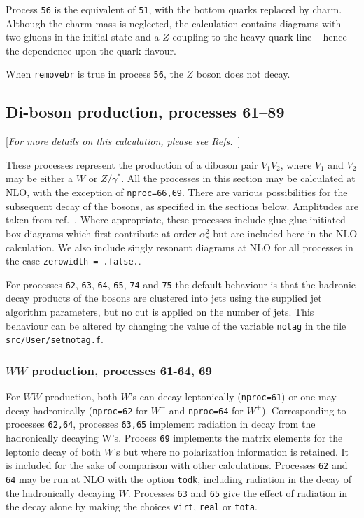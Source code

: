Process {\tt 56} is the equivalent of {\tt 51}, with the bottom quarks
replaced by charm. Although the charm mass is neglected, the calculation
contains diagrams with two gluons in the initial state and a
$Z$ coupling to the heavy quark line -- hence the dependence upon the quark
flavour.

When {\tt removebr} is true in process {\tt 56}, the $Z$ boson does not decay.

\subsection{Di-boson production, processes 61--89}
\label{subsec:diboson}

\begin{center}
[{\it For more details on this calculation, please see Refs.~\cite{Campbell:1999ah,Campbell:2011bn}}]
\end{center}

These processes represent the production of a diboson pair $V_1 V_2$,
where $V_1$ and $V_2$ may be either a $W$ or $Z/\gamma^*$. 
All the processes in this section may be calculated at NLO, with the exception
of {\tt nproc=66,69}. There are various
possibilities for the subsequent decay of the bosons, as specified in the
sections below. Amplitudes are taken from ref.~\cite{Dixon:1998py}.
Where appropriate, these processes include glue-glue initiated box diagrams
which first contribute at order $\alpha_s^2$ but are included here in the
NLO calculation. We also include singly resonant diagrams at NLO for all processes
in the case {\tt zerowidth = .false.}.

For processes {\tt 62}, {\tt 63}, {\tt 64}, {\tt 65}, {\tt 74}
and {\tt 75} the default behaviour is that the hadronic decay products
of the bosons are clustered into jets using the supplied jet
algorithm parameters, but no cut is applied on the number of jets.
This behaviour can be altered by changing the value of the
variable {\tt notag} in the file {\tt src/User/setnotag.f}.
 
\subsubsection{$WW$ production, processes 61-64, 69}

For $WW$ production, both $W$'s can decay leptonically ({\tt nproc=61}) or one
may decay hadronically ({\tt nproc=62} for $W^-$ and {\tt nproc=64} for $W^+$).
Corresponding to processes {\tt 62,64}, processes {\tt 63,65} implement radiation in 
decay from the hadronically decaying W's.
Process {\tt 69} implements the matrix elements for the leptonic decay of
both $W$'s but where no polarization information is retained. It is included
for the sake of comparison with other calculations.
Processes {\tt 62} and {\tt 64} may be run at NLO with the option {\tt todk},
including radiation in the decay of the hadronically decaying $W$.
Processes {\tt 63} and {\tt 65} give the effect of radiation in the decay alone
by making the choices {\tt virt},  {\tt real} or {\tt tota}.

